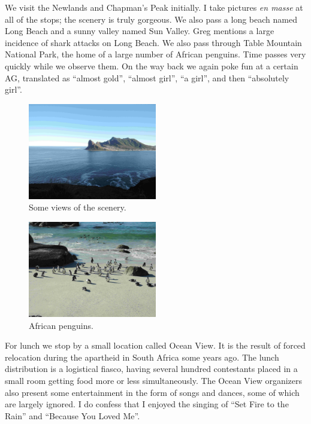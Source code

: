 \documentclass[11pt]{scrreprt}
\numberwithin{figure}{chapter}
\begin{document}
We visit the Newlands and Chapman's Peak initially. I take pictures \emph{en masse} at all of the stops; the
scenery is truly gorgeous.
We also pass a long beach named Long Beach and a sunny valley named Sun Valley.
Greg mentions a large incidence of shark attacks on Long Beach.
We also pass through Table Mountain National Park, the home of a large number of African penguins.
Time passes very quickly while we observe them.
On the way back we again poke fun at a certain AG, translated as ``almost gold'', ``almost girl'',
``a girl'', and then ``absolutely girl''.

\begin{figure}[ht]
  \centering
  \includegraphics[width=0.5\textwidth]{media/scenery.jpg}
  \caption{Some views of the scenery.}
\end{figure}
\begin{figure}[ht]
  \centering
  \includegraphics[width=0.5\textwidth]{media/penguins.jpg}
  \caption{African penguins.}
\end{figure}


For lunch we stop by a small location called Ocean View. It is the result of forced relocation during
the apartheid in South Africa some years ago. The lunch distribution is a logistical fiasco, having several
hundred contestants placed in a small room getting food more or less simultaneously.
The Ocean View organizers also present some entertainment in the form of songs and dances, some of which are
largely ignored. I do confess that I enjoyed the singing of ``Set Fire to the Rain'' and ``Because You Loved Me''.
\end{document}
